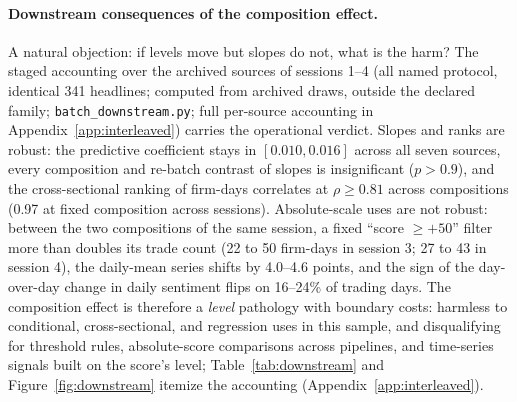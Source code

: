 \paragraph{Downstream consequences of the composition effect.} A natural objection: if levels move but slopes do not, what is the harm? The staged accounting over the archived sources of sessions 1--4 (all named protocol, identical 341 headlines; computed from archived draws, outside the declared family; \texttt{batch\_downstream.py}; full per-source accounting in Appendix~\ref{app:interleaved}) carries the operational verdict. Slopes and ranks are robust: the predictive coefficient stays in $[0.010, 0.016]$ across all seven sources, every composition and re-batch contrast of slopes is insignificant ($p>0.9$), and the cross-sectional ranking of firm-days correlates at $\rho\geq 0.81$ across compositions (0.97 at fixed composition across sessions). Absolute-scale uses are not robust: between the two compositions of the same session, a fixed ``score $\geq +50$'' filter more than doubles its trade count (22 to 50 firm-days in session 3; 27 to 43 in session 4), the daily-mean series shifts by 4.0--4.6 points, and the sign of the day-over-day change in daily sentiment flips on 16--24\% of trading days. The composition effect is therefore a \emph{level} pathology with boundary costs: harmless to conditional, cross-sectional, and regression uses in this sample, and disqualifying for threshold rules, absolute-score comparisons across pipelines, and time-series signals built on the score's level; Table~\ref{tab:downstream} and Figure~\ref{fig:downstream} itemize the accounting (Appendix~\ref{app:interleaved}).

